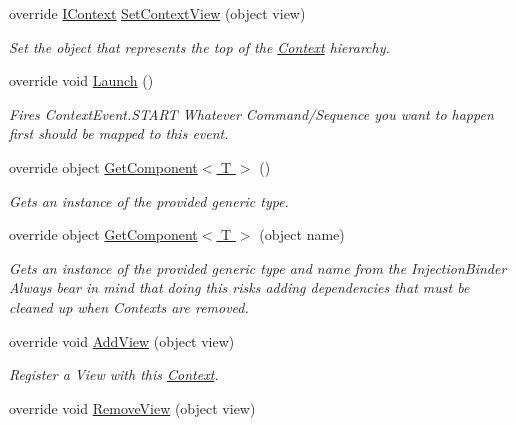 \begin{DoxyCompactItemize}
\item 
override \hyperlink{interfacestrange_1_1extensions_1_1context_1_1api_1_1_i_context}{I\-Context} \hyperlink{classstrange_1_1extensions_1_1context_1_1impl_1_1_m_v_c_s_context_aecc258bb5f3d3edd1a3f93ca33a2ce4e}{Set\-Context\-View} (object view)
\begin{DoxyCompactList}\small\item\em Set the object that represents the top of the \hyperlink{classstrange_1_1extensions_1_1context_1_1impl_1_1_context}{Context} hierarchy. \end{DoxyCompactList}\item 
override void \hyperlink{classstrange_1_1extensions_1_1context_1_1impl_1_1_m_v_c_s_context_a70e1400cfb5a71447080acdf79ca93f9}{Launch} ()
\begin{DoxyCompactList}\small\item\em Fires Context\-Event.\-S\-T\-A\-R\-T Whatever Command/\-Sequence you want to happen first should be mapped to this event. \end{DoxyCompactList}\item 
override object \hyperlink{classstrange_1_1extensions_1_1context_1_1impl_1_1_m_v_c_s_context_a094adf14d43505eaa0d5c2c786c2e5f9}{Get\-Component$<$ T $>$} ()
\begin{DoxyCompactList}\small\item\em Gets an instance of the provided generic type. \end{DoxyCompactList}\item 
override object \hyperlink{classstrange_1_1extensions_1_1context_1_1impl_1_1_m_v_c_s_context_a6ea387573cba1bfe0a629dec3d1e6b37}{Get\-Component$<$ T $>$} (object name)
\begin{DoxyCompactList}\small\item\em Gets an instance of the provided generic type and name from the Injection\-Binder Always bear in mind that doing this risks adding dependencies that must be cleaned up when Contexts are removed. \end{DoxyCompactList}\item 
\hypertarget{classstrange_1_1extensions_1_1context_1_1impl_1_1_m_v_c_s_context_ae93688d0d17d6523f11d37c6ffee93a0}{override void \hyperlink{classstrange_1_1extensions_1_1context_1_1impl_1_1_m_v_c_s_context_ae93688d0d17d6523f11d37c6ffee93a0}{Add\-View} (object view)}\label{classstrange_1_1extensions_1_1context_1_1impl_1_1_m_v_c_s_context_ae93688d0d17d6523f11d37c6ffee93a0}

\begin{DoxyCompactList}\small\item\em Register a View with this \hyperlink{classstrange_1_1extensions_1_1context_1_1impl_1_1_context}{Context}. \end{DoxyCompactList}\item 
\hypertarget{classstrange_1_1extensions_1_1context_1_1impl_1_1_m_v_c_s_context_a35068ddfa0cbd9aa94c5c02ba9969588}{override void \hyperlink{classstrange_1_1extensions_1_1context_1_1impl_1_1_m_v_c_s_context_a35068ddfa0cbd9aa94c5c02ba9969588}{Remove\-View} (object view)}\label{classstrange_1_1extensions_1_1context_1_1impl_1_1_m_v_c_s_context_a35068ddfa0cbd9aa94c5c02ba9969588}


\end{DoxyCompactItemize}
